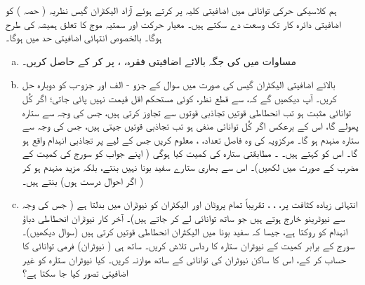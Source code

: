ہم کلاسیکی حرکی توانائی  میں اضافیتی کلیہ  پر کرتے ہوئے آزاد الیکٹران گیس نظریہ ( حصہ ) کو اضافیتی دائرہ کار تک وسعت دے سکتے ہیں۔ معیار حرکت اور سمتیہ موج کا تعلق ہمیشہ کی طرح  ہوگا۔ بالخصوص انتہائی اضافیتی حد میں  ہوگا۔ 
\begin{enumerate}[a.]
\item
مساوات  میں  کی جگہ بالائے اضافیتی فقرہ، ، پر کر کے  حاصل کریں۔
\item
بالائے اضافیتی الیکٹران گیس کی صورت میں سوال  کے جزو - الف اور جزو-ب کو دوبارہ حل کریں۔ آپ دیکھیں گے کہ،  سے قطع نظر، کوئی مستحکم اقل قیمت نہیں پائی جاتی؛ اگر کُل توانائی مثبت ہو تب انحطاطی قوتیں تجاذبی قوتوں سے تجاوز کرتی ہیں، جس کی وجہ سے ستارہ پھولے گا، اس کے برعکس اگر کُل توانائی منفی ہو تب تجاذبی قوتيں جیتی ہیں، جس کی وجہ سے ستارہ منہدم ہو گا۔ مرکزویہ کی وہ فاصل تعداد، ، معلوم کریں جس کے لیے  پر تجاذبی انہدام واقع ہو گا۔ اس کو  کہتے ہیں۔  ۔ مطابقتی ستارہ کی کمیت کیا ہوگی ( اپنے جواب کو سورج کی کمیت کے مضرب کے صورت میں لکھیں)۔ اس سے بھاری ستارے سفید بونا نہیں بنتے، بلکہ مزید منہدم ہو کر ( اگر احوال درست ہوں)  بنتے ہیں۔
\item
انتہائی زیادہ کثافت پر، ، ، تقریباً تمام پروٹان اور الیکٹران کو نیوٹران میں بدلتا ہے ( جس کی وجہ سے نیوٹرینو خارج ہوتے ہیں جو ساتھ توانائی لے کر جاتے ہیں)۔ آخر کار نیوٹران انحطاطی دباؤ انہدام کو روکتا ہے، جیسا کہ سفید بونا میں الیکٹران انحطاطی قوتیں کرتی ہیں (سوال  دیکھیں)۔ سورج کے برابر کمیت کے نیوٹران ستارہ کا رداس تلاش کریں۔ ساتھ ہی ( نیوٹران) فرمی توانائی کا حساب کر کے، اس کا ساکن نیوٹران کی توانائی کے ساتھ موازنہ کریں۔ کیا نیوٹران ستارہ کو غیر اضافیتی تصور کیا جا سکتا ہے؟ 
\end{enumerate}
